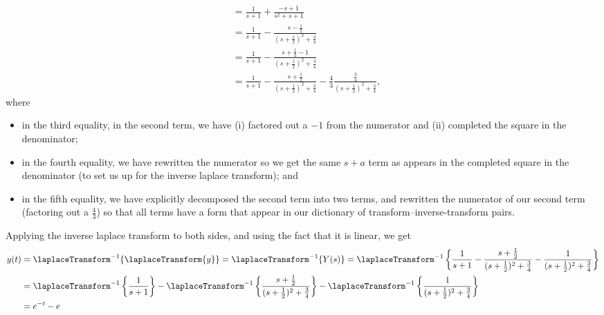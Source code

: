{\begin{align*}
&=
\frac{1}{s + 1} + \frac{-s + 1}{s^{2} + s + 1}
\\
&=
\frac{1}{s + 1} - \frac{s - \frac{1}{2}}{(s + \frac{1}{2})^{2} + \frac{3}{4}}
\\
&=
\frac{1}{s + 1} - \frac{s + \frac{1}{2} - 1}{(s + \frac{1}{2})^{2} + \frac{3}{4}}
\\
&=
\frac{1}{s + 1} - \frac{s + \frac{1}{2}}{(s + \frac{1}{2})^{2} + \frac{3}{4}} - \frac{4}{3} \frac{\frac{3}{4}}{(s + \frac{1}{2})^{2} + \frac{3}{4}},
\end{align*}
where
\begin{itemize}
\item in the third equality, in the second term, we have (i) factored out a $-1$ from the numerator and (ii) completed the square in the denominator;
\item in the fourth equality, we have rewritten the numerator so we get the same $s + a$ term as appears in the completed square in the denominator (to set us up for the inverse laplace transform); and
\item in the fifth equality, we have explicitly decomposed the second term into two terms, and rewritten the numerator of our second term (factoring out a $\frac{4}{3}$) so that all terms have a form that appear in our dictionary of transform--inverse-transform pairs.
\end{itemize}
Applying the inverse laplace transform to both sides, and using the fact that it is linear, we get
\begin{align*}
y(t)
&=
\laplaceTransform^{-1}\{\laplaceTransform\{y\}\}
=
\laplaceTransform^{-1}\{Y(s)\}
=
\laplaceTransform^{-1}\left\{\frac{1}{s + 1} - \frac{s + \frac{1}{2}}{(s + \frac{1}{2})^{2} + \frac{3}{4}} - \frac{1}{(s + \frac{1}{2})^{2} + \frac{3}{4}}\right\}
\\
&=
\laplaceTransform^{-1}\left\{\frac{1}{s + 1}\right\} - \laplaceTransform^{-1}\left\{\frac{s + \frac{1}{2}}{(s + \frac{1}{2})^{2} + \frac{3}{4}}\right\} - \laplaceTransform^{-1}\left\{\frac{1}{(s + \frac{1}{2})^{2} + \frac{3}{4}}\right\}
\\
&=
e^{-t} - e^{}
\end{align*}}%